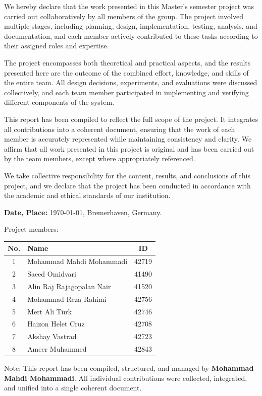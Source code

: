 \documentclass[11pt, a4paper]{report}
\begin{document}
We hereby declare that the work presented in this Master’s semester project was carried out collaboratively by all members of the group. The project involved multiple stages, including planning, design, implementation, testing, analysis, and documentation, and each member actively contributed to these tasks according to their assigned roles and expertise.

The project encompasses both theoretical and practical aspects, and the results presented here are the outcome of the combined effort, knowledge, and skills of the entire team. All design decisions, experiments, and evaluations were discussed collectively, and each team member participated in implementing and verifying different components of the system.

This report has been compiled to reflect the full scope of the project. It integrates all contributions into a coherent document, ensuring that the work of each member is accurately represented while maintaining consistency and clarity. We affirm that all work presented in this project is original and has been carried out by the team members, except where appropriately referenced.

We take collective responsibility for the content, results, and conclusions of this project, and we declare that the project has been conducted in accordance with the academic and ethical standards of our institution.

\vspace{1em}
\textbf{Date, Place:} \today, Bremerhaven, Germany.

\vspace{2cm}
Project members: \\
\begin{tabular}{c l c}
\textbf{No.} & \textbf{Name} & \textbf{ID} \\
\hline
1 & Mohammad Mahdi Mohammadi & 42719 \\
2 & Saeed Omidvari & 41490 \\
3 & Alin Raj Rajagopalan Nair & 41520 \\
4 & Mohammad Reza Rahimi & 42756 \\
5 & Mert Ali Türk & 42746 \\
6 & Haizon Helet Cruz & 42708 \\
7 & Akshay Vastrad & 42723 \\
8 & Ameer Muhammed & 42843 \\
\end{tabular}

\vspace{1em}
\noindent
Note: This report has been compiled, structured, and managed by \textbf{Mohammad Mahdi Mohammadi}. All individual contributions were collected, integrated, and unified into a single coherent document.
	\newpage
		\thispagestyle{empty}
		\tableofcontents
		
\end{document}
